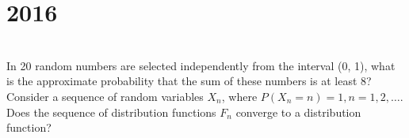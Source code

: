 \section*{2016}
\vspace{-.5cm}
\hrulefill \smallskip\\
 In 20 random numbers are selected independently from the interval (0, 1), what is the approximate probability that the sum of these numbers is at least 8?
\myline
{} Consider a sequence of random variables ${X_n}$, where $P(X_n = n) = 1, n = 1,2,\ldots$. Does the sequence of distribution functions ${F_n}$ converge to a distribution function? 